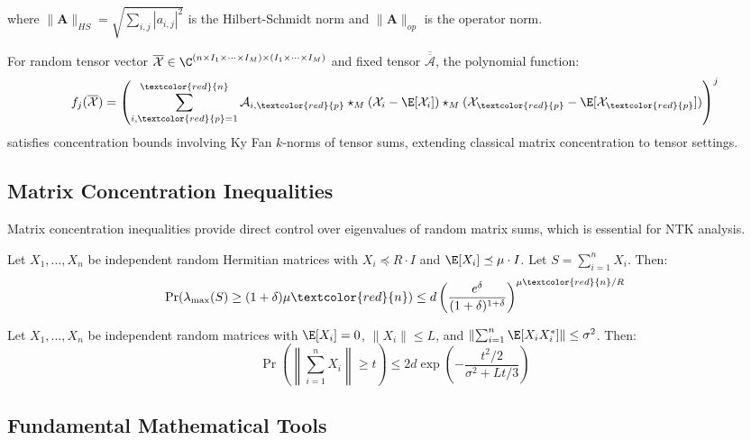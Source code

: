where $\|\mathbf{A}\|_{HS} = \sqrt{\sum_{i,j} |a_{i,j}|^2}$ is the Hilbert-Schmidt norm and $\|\mathbf{A}\|_{op}$ is the operator norm.

\begin{theorem}
For random tensor vector $\overline{\mathcal{X}} \in \C^{(n \times I_1 \times \cdots \times I_M) \times (I_1 \times \cdots \times I_M)}$ and fixed tensor $\overline{\overline{\mathcal{A}}}$, the polynomial function:
$$f_j(\overline{\mathcal{X}}) = \left(\sum_{i,\textcolor{red}{p}=1}^{\textcolor{red}{n}} \mathcal{A}_{i,\textcolor{red}{p}} \star_M (\mathcal{X}_i - \E[\mathcal{X}_i]) \star_M (\mathcal{X}_{\textcolor{red}{p}} - \E[\mathcal{X}_{\textcolor{red}{p}}])\right)^j$$
satisfies concentration bounds involving Ky Fan $k$-norms of tensor sums, extending classical matrix concentration to tensor settings.
\end{theorem}

\subsection{Matrix Concentration Inequalities}

Matrix concentration inequalities provide direct control over eigenvalues of random matrix sums, which is essential for NTK analysis.

\begin{theorem}
Let $X_1, \ldots, X_n$ be independent random Hermitian matrices with $X_i \preceq R \cdot I$ and $\E[X_i] \preceq \mu \cdot I$. Let $S = \sum_{i=1}^n X_i$. Then:
$$\Pr(\lambda_{\max}(S) \geq (1+\delta)\mu \textcolor{red}{n}) \leq d \left(\frac{e^\delta}{(1+\delta)^{1+\delta}}\right)^{\mu \textcolor{red}{n} / R}$$
\end{theorem}

\begin{theorem}
Let $X_1, \ldots, X_n$ be independent random matrices with $\E[X_i] = 0$, $\|X_i\| \leq L$, and $\left\|\sum_{i=1}^n \E[X_i X_i^*]\right\| \leq \sigma^2$. Then:
$$\Pr\left(\left\|\sum_{i=1}^n X_i\right\| \geq t\right) \leq 2d \exp\left(-\frac{t^2/2}{\sigma^2 + Lt/3}\right)$$
\end{theorem}



\subsection{Fundamental Mathematical Tools}

